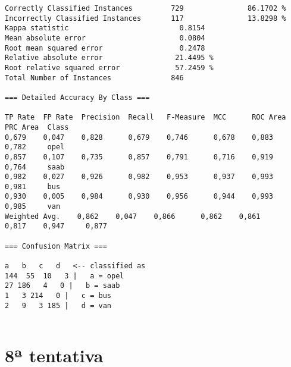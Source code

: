 \documentclass[
	article,			%
	11pt,				%
	oneside,			%
	a4paper,			%
	english,			%
	brazil,				%
	sumario=tradicional
	]{abntex2}
\begin{document}
\begin{lstlisting}
Correctly Classified Instances         729               86.1702 %
Incorrectly Classified Instances       117               13.8298 %
Kappa statistic                          0.8154
Mean absolute error                      0.0804
Root mean squared error                  0.2478
Relative absolute error                 21.4495 %
Root relative squared error             57.2459 %
Total Number of Instances              846     

=== Detailed Accuracy By Class ===

TP Rate  FP Rate  Precision  Recall   F-Measure  MCC      ROC Area  PRC Area  Class
0,679    0,047    0,828      0,679    0,746      0,678    0,883     0,782     opel
0,857    0,107    0,735      0,857    0,791      0,716    0,919     0,764     saab
0,982    0,027    0,926      0,982    0,953      0,937    0,993     0,981     bus
0,930    0,005    0,984      0,930    0,956      0,944    0,993     0,985     van
Weighted Avg.    0,862    0,047    0,866      0,862    0,861      0,817    0,947     0,877     

=== Confusion Matrix ===

a   b   c   d   <-- classified as
144  55  10   3 |   a = opel
27 186   4   0 |   b = saab
1   3 214   0 |   c = bus
2   9   3 185 |   d = van


\end{lstlisting}

\section{8ª tentativa}
\end{document}
